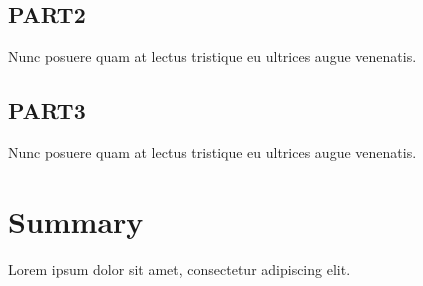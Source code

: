 \subsection{PART2}

Nunc posuere quam at lectus tristique eu ultrices augue venenatis.

\subsection{PART3}

Nunc posuere quam at lectus tristique eu ultrices augue venenatis.


\section{Summary}

Lorem ipsum dolor sit amet, consectetur adipiscing elit.